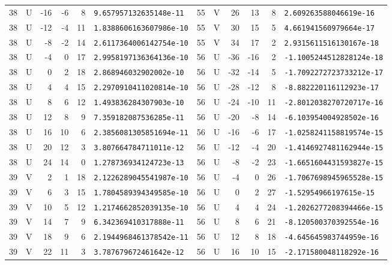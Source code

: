 \begin{longtable}{rcrrrl|rcrrrl}
38 & U & -16 & -6 & 8 & \texttt{9.657957132635148e-11} & 55 & V & 26 & 13 & 8 & \texttt{2.609263588046619e-16}\\
38 & U & -12 & -4 & 11 & \texttt{1.8388606163607986e-10} & 55 & V & 30 & 15 & 5 & \texttt{4.661941560979664e-17}\\
38 & U & -8 & -2 & 14 & \texttt{2.6117364006142754e-10} & 55 & V & 34 & 17 & 2 & \texttt{2.9315611516130167e-18}\\
38 & U & -4 & 0 & 17 & \texttt{2.9958197136364136e-10} & 56 & U & -36 & -16 & 2 & \texttt{-1.1005244512828124e-18}\\
38 & U & 0 & 2 & 18 & \texttt{2.868946032902002e-10} & 56 & U & -32 & -14 & 5 & \texttt{-1.7092272723733212e-17}\\
38 & U & 4 & 4 & 15 & \texttt{2.2970910411020814e-10} & 56 & U & -28 & -12 & 8 & \texttt{-8.882220116112923e-17}\\
38 & U & 8 & 6 & 12 & \texttt{1.493836284307903e-10} & 56 & U & -24 & -10 & 11 & \texttt{-2.8012038270720717e-16}\\
38 & U & 12 & 8 & 9 & \texttt{7.359182087536285e-11} & 56 & U & -20 & -8 & 14 & \texttt{-6.103954004928502e-16}\\
38 & U & 16 & 10 & 6 & \texttt{2.3856081305851694e-11} & 56 & U & -16 & -6 & 17 & \texttt{-1.0258241158819574e-15}\\
38 & U & 20 & 12 & 3 & \texttt{3.807664784711011e-12} & 56 & U & -12 & -4 & 20 & \texttt{-1.4146927481162944e-15}\\
38 & U & 24 & 14 & 0 & \texttt{1.278736934124723e-13} & 56 & U & -8 & -2 & 23 & \texttt{-1.6651604431593827e-15}\\
39 & V & 2 & 1 & 18 & \texttt{2.1226289045541987e-10} & 56 & U & -4 & 0 & 26 & \texttt{-1.7067698945965528e-15}\\
39 & V & 6 & 3 & 15 & \texttt{1.7804589394349585e-10} & 56 & U & 0 & 2 & 27 & \texttt{-1.52954966197615e-15}\\
39 & V & 10 & 5 & 12 & \texttt{1.2174662852039135e-10} & 56 & U & 4 & 4 & 24 & \texttt{-1.2026277208394466e-15}\\
39 & V & 14 & 7 & 9 & \texttt{6.342369410317888e-11} & 56 & U & 8 & 6 & 21 & \texttt{-8.120500370392554e-16}\\
39 & V & 18 & 9 & 6 & \texttt{2.1944968461378542e-11} & 56 & U & 12 & 8 & 18 & \texttt{-4.645645983744959e-16}\\
39 & V & 22 & 11 & 3 & \texttt{3.787679672461642e-12} & 56 & U & 16 & 10 & 15 & \texttt{-2.171580048118292e-16}\\

\end{longtable}
